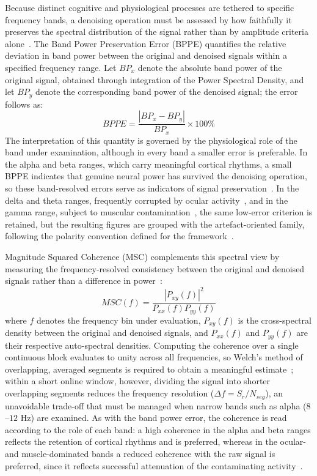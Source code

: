\documentclass[MScCS,12pt,oneside,final]{uccthesis}
\begin{document}
        Because distinct cognitive and physiological processes are tethered to specific frequency bands, a denoising operation must be assessed by how faithfully it preserves the spectral distribution of the signal rather than by amplitude criteria alone~\parencite{cohen2014analyzing}. The Band Power Preservation Error (BPPE) quantifies the relative deviation in band power between the original and denoised signals within a specified frequency range. Let $BP_x$ denote the absolute band power of the original signal, obtained through integration of the Power Spectral Density, and let $BP_y$ denote the corresponding band power of the denoised signal; the error follows as:
        \begin{equation}
            BPPE = \frac{|BP_x - BP_y|}{BP_x} \times 100\%
        \label{eq:bppe}
        \end{equation}
        The interpretation of this quantity is governed by the physiological role of the band under examination, although in every band a smaller error is preferable. In the alpha and beta ranges, which carry meaningful cortical rhythms, a small BPPE indicates that genuine neural power has survived the denoising operation, so these band-resolved errors serve as indicators of signal preservation~\parencite{cohen2014analyzing}. In the delta and theta ranges, frequently corrupted by ocular activity~\parencite{croft2000removal}, and in the gamma range, subject to muscular contamination~\parencite{muthukumaraswamy2013high}, the same low-error criterion is retained, but the resulting figures are grouped with the artefact-oriented family, following the polarity convention defined for the framework~\parencite{longo2025oneegwavelad}.

        Magnitude Squared Coherence (MSC) complements this spectral view by measuring the frequency-resolved consistency between the original and denoised signals rather than a difference in power~\parencite{sweeney2012artifact}:
        \begin{equation}
            MSC(f) = \frac{|P_{xy}(f)|^2}{P_{xx}(f)P_{yy}(f)}
        \label{eq:msc}
        \end{equation}
        where $f$ denotes the frequency bin under evaluation, $P_{xy}(f)$ is the cross-spectral density between the original and denoised signals, and $P_{xx}(f)$ and $P_{yy}(f)$ are their respective auto-spectral densities. Computing the coherence over a single continuous block evaluates to unity across all frequencies, so Welch's method of overlapping, averaged segments is required to obtain a meaningful estimate~\parencite{sweeney2012artifact}; within a short online window, however, dividing the signal into shorter overlapping segments reduces the frequency resolution ($\Delta f = S_r / N_{seg}$), an unavoidable trade-off that must be managed when narrow bands such as alpha ($8$--$12$ Hz) are examined. As with the band power error, the coherence is read according to the role of each band: a high coherence in the alpha and beta ranges reflects the retention of cortical rhythms and is preferred, whereas in the ocular- and muscle-dominated bands a reduced coherence with the raw signal is preferred, since it reflects successful attenuation of the contaminating activity~\parencite{longo2025oneegwavelad}.
\end{document}
